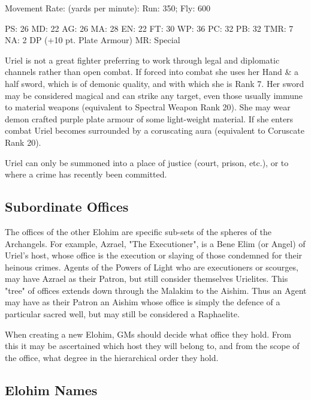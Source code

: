 \begin{Description}
Movement Rate: (yards per minute): Run: 350; Fly: 600

PS: 26	MD: 22	AG: 26	MA: 28
EN: 22	FT: 30	WP: 36	PC: 32
PB: 32	TMR: 7	NA: 2 DP (+10 pt. Plate Armour)
MR: Special

\item[Weapons] Uriel is not a great fighter preferring to work through
  legal and diplomatic channels rather than open combat. If forced
  into combat she uses her Hand \& a half sword, which is of demonic
  quality, and with which she is Rank 7. Her sword may be considered
  magical and can strike any target, even those usually immune to
  material weapons (equivalent to Spectral Weapon Rank 20). She may
  wear demon crafted purple plate armour of some light-weight
  material. If she enters combat Uriel becomes surrounded by a
  coruscating aura (equivalent to Coruscate Rank 20).
  
\item[Avatar Summoning] Uriel can only be summoned into a place of
  justice (court, prison, etc.), or to where a crime has recently been
  committed.

\end{Description}

\subsection{Subordinate Offices}

The offices of the other Elohim are specific sub-sets of the spheres
of the Archangels.  For example, Azrael, "The Executioner", is a Bene
Elim (or Angel) of Uriel's host, whose office is the execution or
slaying of those condemned for their heinous crimes. Agents of the
Powers of Light who are executioners or scourges, may have Azrael as
their Patron, but still consider themselves Urielites. This "tree" of
offices extends down through the Malakim to the Aishim. Thus an Agent
may have as their Patron an Aishim whose office is simply the defence
of a particular sacred well, but may still be considered a Raphaelite.

When creating a new Elohim, GMs should decide what office they hold.
From this it may be ascertained which host they will belong to, and
from the scope of the office, what degree in the hierarchical order
they hold.

\subsection{Elohim Names}

